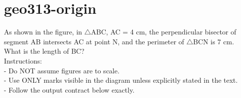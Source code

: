 \documentclass[12pt]{article}
\begin{document}
\section*{geo313-origin}
\noindent\begin{minipage}{\textwidth}
\setlength{\parskip}{4pt}
As shown in the figure, in \ensuremath{\triangle }ABC, AC = 4 cm, the perpendicular bisector of segment AB intersects AC at point N, and the perimeter of \ensuremath{\triangle }BCN is 7 cm. What is the length of BC?\\
Instructions:\\
- Do NOT assume figures are to scale.\\
- Use ONLY marks visible in the diagram unless explicitly stated in the text.\\
- Follow the output contract below exactly.\\
\end{minipage}
\end{document}
